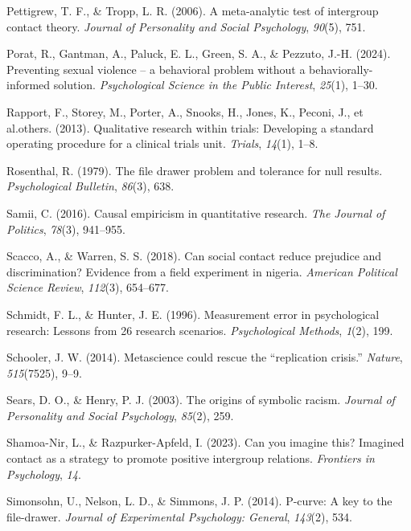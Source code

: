 \documentclass[
  man]{apa6}
\newlength{\cslhangindent}
\newenvironment{CSLReferences}[2] %
 {\begin{list}{}{%
  \setlength{\itemindent}{0pt}
  \setlength{\leftmargin}{0pt}
  \setlength{\parsep}{0pt}
  \ifodd #1
   \setlength{\leftmargin}{\cslhangindent}
   \setlength{\itemindent}{-1\cslhangindent}
  \fi
  \setlength{\itemsep}{#2\baselineskip}}}
 {\end{list}}
\begin{document}
\begin{CSLReferences}{1}{0}
Pettigrew, T. F., \& Tropp, L. R. (2006). A meta-analytic test of intergroup contact theory. \emph{Journal of Personality and Social Psychology}, \emph{90}(5), 751.

Porat, R., Gantman, A., Paluck, E. L., Green, S. A., \& Pezzuto, J.-H. (2024). Preventing sexual violence -- a behavioral problem without a behaviorally-informed solution. \emph{Psychological Science in the Public Interest}, \emph{25}(1), 1--30.

Rapport, F., Storey, M., Porter, A., Snooks, H., Jones, K., Peconi, J., et al.others. (2013). Qualitative research within trials: Developing a standard operating procedure for a clinical trials unit. \emph{Trials}, \emph{14}(1), 1--8.

Rosenthal, R. (1979). The file drawer problem and tolerance for null results. \emph{Psychological Bulletin}, \emph{86}(3), 638.

Samii, C. (2016). Causal empiricism in quantitative research. \emph{The Journal of Politics}, \emph{78}(3), 941--955.

Scacco, A., \& Warren, S. S. (2018). Can social contact reduce prejudice and discrimination? Evidence from a field experiment in nigeria. \emph{American Political Science Review}, \emph{112}(3), 654--677.

Schmidt, F. L., \& Hunter, J. E. (1996). Measurement error in psychological research: Lessons from 26 research scenarios. \emph{Psychological Methods}, \emph{1}(2), 199.

Schooler, J. W. (2014). Metascience could rescue the {``replication crisis.''} \emph{Nature}, \emph{515}(7525), 9--9.

Sears, D. O., \& Henry, P. J. (2003). The origins of symbolic racism. \emph{Journal of Personality and Social Psychology}, \emph{85}(2), 259.

Shamoa-Nir, L., \& Razpurker-Apfeld, I. (2023). Can you imagine this? Imagined contact as a strategy to promote positive intergroup relations. \emph{Frontiers in Psychology}, \emph{14}.

Simonsohn, U., Nelson, L. D., \& Simmons, J. P. (2014). P-curve: A key to the file-drawer. \emph{Journal of Experimental Psychology: General}, \emph{143}(2), 534.


\end{CSLReferences}
\end{document}
